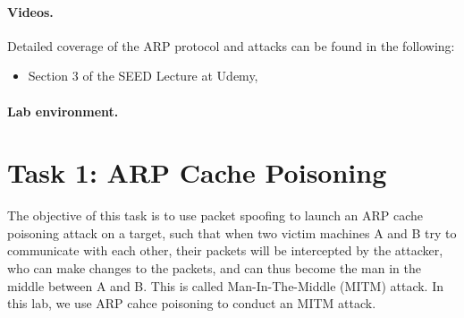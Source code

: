 \paragraph{Videos.}
Detailed coverage of the ARP protocol and attacks can be found in the following:

\begin{itemize}
\item Section 3 of the SEED Lecture at Udemy, \seedisvideo
\end{itemize}


\paragraph{Lab environment.} \seedenvironment


\section{Task 1: ARP Cache Poisoning}
\label{tt}


The objective of this task is to use packet spoofing to launch an ARP cache poisoning attack on
a target, such that when two victim machines A and B try to communicate with each other, their
packets will be intercepted by the attacker, who can make changes to the packets, and can thus
become the man in the middle between A and B. This is called Man-In-The-Middle (MITM) attack.
In this lab, we use ARP cahce poisoning to conduct an MITM attack. 


\begin{comment}
ARP is insecure, as any device can send an ARP reply packet to another host
and force that host to update its ARP table or cache with the new value.
Basically, an attacker takes advantage of this and poisons the ARP table. Suppose a victim requests for something on network
with some default gateway. All information will pass through that gateway. 
An attacker can act as a default gateway for the victim, so that every request will go through him.

Since our VMs are in the same network, There is no need of any gateway for their
communication. However, if host C wants to intercept the traffics between 
host A and host B, it can spoof an ARP reply packet to A, and tell this machine 
to update its ARP cache, replace the MAC address of B with C's MAC address. 
Then A will consider C as the default gateway, and all the traffics from A will go through C.
\end{comment}

